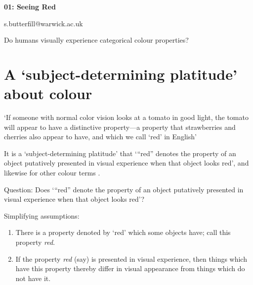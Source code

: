\documentclass[12pt]{extarticle}
\date{}
\makeatletter
\def \ititle {Origins of Mind}
\def \iemail{s.butterfill@warwick.ac.uk}
\makeatother
\begin{document}
\begin{multicols*}{3}

\setlength\footnotesep{1em}













\def \ititle {01: Seeing Red}

\begin{center}

{\Large

\textbf{\ititle}

}



\iemail %

\end{center}


Do humans visually experience categorical colour properties?


\section{A ‘subject-determining platitude’ about colour}

‘If someone with normal color vision looks at a tomato in good light, the tomato will appear to have a distinctive property—a property that strawberries and cherries also appear to have, and which we call ‘red’ in English’ \citep[p.\ 4]{byrne:2003_color}

It is a ‘subject-determining platitude’
that ‘“red” denotes the property of an object putatively presented in visual experience
when that object looks red’, and likewise for other colour terms
\citep[pp.\ 199--200]{Jackson:1996zz}.

Question:
Does ‘“red” denote the property of an object putatively presented in visual experience when that object looks red’?


Simplifying assumptions:

\begin{enumerate}
\item There is a property denoted by ‘red’ which some objects have;  call this property   \emph{red}.
\item If the property \emph{red} (say) is presented in visual experience, then things which have this property  thereby differ in  visual appearance from things which do not have it.
\end{enumerate}


\end{multicols*}
\end{document}
